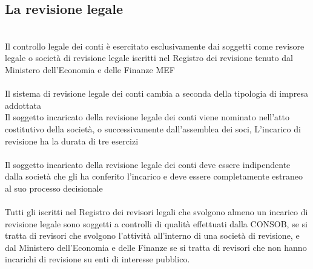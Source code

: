 \documentclass{report}
\begin{document}
\subsection{La revisione legale} %
\label{sub:La revisione legale}
\\
Il controllo legale dei conti è esercitato esclusivamente dai soggetti come revisore legale o società di revisione legale iscritti nel Registro dei revisione tenuto dal Ministero dell'Economia e delle Finanze MEF
\\
\\
Il sistema di revisione legale dei conti cambia a seconda della tipologia di impresa addottata
\\
Il soggetto incaricato della revisione legale dei conti viene nominato nell'atto costitutivo della società, o successivamente dall'assemblea dei soci, L'incarico di revisione ha la durata di tre esercizi
\\
\\
Il soggetto incaricato della revisione legale dei conti deve essere indipendente dalla società che gli ha conferito l'incarico e deve essere completamente estraneo al suo processo decisionale
\\
\\
Tutti gli iscritti nel Registro dei revisori legali che svolgono almeno un incarico di revisione legale sono soggetti a controlli di qualità effettuati dalla CONSOB, se si tratta di revisori che svolgono l'attività all'interno di una società di revisione, e dal Ministero dell'Economia e delle Finanze se si tratta di revisori che non hanno incarichi di revisione su enti di interesse pubblico.
\end{document}
